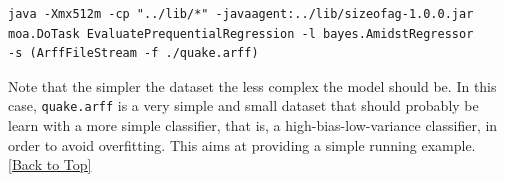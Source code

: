 \documentclass[10pt,a4paper]{article}
\begin{document}
\begin{lstlisting}
java -Xmx512m -cp "../lib/*" -javaagent:../lib/sizeofag-1.0.0.jar 
moa.DoTask EvaluatePrequentialRegression -l bayes.AmidstRegressor
-s (ArffFileStream -f ./quake.arff)
\end{lstlisting}

Note that the simpler the dataset the less complex the model should be. In this case, \texttt{quake.arff} is a very simple and small dataset that should probably be learn with a more simple classifier, that is, a high-bias-low-variance classifier, in order to avoid overfitting. This aims at providing a simple running example.
\hyperref[sec:bns]{[Back to Top]}\newline 
\end{document}

